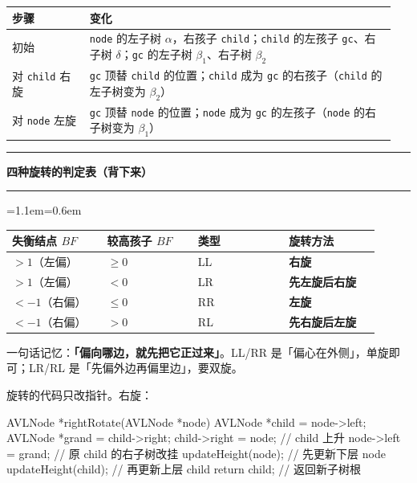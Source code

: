 \documentclass[11pt,openany,UTF8]{ctexbook}
\newcommand{\callouthead}[2]{%
  \par\addvspace{7pt}\noindent
  {\color{#1}\rule[-0.15em]{3pt}{1.05em}}\hspace{0.5em}%
  {\bfseries\color{#1}#2}\par\nobreak\vspace{-0.35em}%
  {\color{rulesep}\hrule height 0.4pt}\nobreak\vspace{0.45em}%
  \begingroup\small\setlength{\parindent}{0pt}%
  \leftskip=1.1em\rightskip=0.6em\noindent\ignorespaces}
\newcommand{\calloutend}{\par\endgroup\addvspace{7pt}}
\newenvironment{callkey}[1]{\callouthead{keybar}{#1}}{\calloutend}
\begin{document}
\begingroup\small\setlength{\tabcolsep}{4.0pt}
\begin{longtable}{@{}L{0.1936\linewidth}L{0.7521\linewidth}@{}}
\toprule
\textbf{步骤} & \textbf{变化} \\
\midrule
\endhead
初始 & \texttt{node} 的左子树 $\alpha$，右孩子 \texttt{child}；\texttt{child} 的左孩子 \texttt{gc}、右子树 $\delta$；\texttt{gc} 的左子树 $\beta_1$、右子树 $\beta_2$ \\
对 \texttt{child} 右旋 & \texttt{gc} 顶替 \texttt{child} 的位置；\texttt{child} 成为 \texttt{gc} 的右孩子（\texttt{child} 的左子树变为 $\beta_2$） \\
对 \texttt{node} 左旋 & \texttt{gc} 顶替 \texttt{node} 的位置；\texttt{node} 成为 \texttt{gc} 的左孩子（\texttt{node} 的右子树变为 $\beta_1$） \\
\bottomrule
\end{longtable}
\endgroup

\begin{callkey}{四种旋转的判定表（背下来）}
\begingroup\small\setlength{\tabcolsep}{4.0pt}
\begin{longtable}{@{}L{0.2363\linewidth}L{0.2250\linewidth}L{0.2250\linewidth}L{0.2250\linewidth}@{}}
\toprule
\textbf{失衡结点 $BF$} & \textbf{较高孩子 $BF$} & \textbf{类型} & \textbf{旋转方法} \\
\midrule
\endhead
$>1$（左偏） & $\ge 0$ & LL & \textbf{右旋} \\
$>1$（左偏） & $<0$ & LR & \textbf{先左旋后右旋} \\
$<-1$（右偏） & $\le 0$ & RR & \textbf{左旋} \\
$<-1$（右偏） & $>0$ & RL & \textbf{先右旋后左旋} \\
\bottomrule
\end{longtable}
\endgroup

一句话记忆：\textbf{「偏向哪边，就先把它正过来」}。LL/RR 是「偏心在外侧」，单旋即可；LR/RL 是「先偏外边再偏里边」，要双旋。

\end{callkey}

旋转的代码只改指针。右旋：

\begin{codebox}
AVLNode *rightRotate(AVLNode *node) {
    AVLNode *child = node->left;
    AVLNode *grand = child->right;
    child->right = node;      // child 上升
    node->left   = grand;     // 原 child 的右子树改挂
    updateHeight(node);       // 先更新下层 node
    updateHeight(child);      // 再更新上层 child
    return child;             // 返回新子树根
}
\end{codebox}
\end{document}
